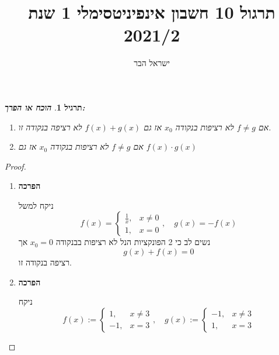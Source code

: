 \documentclass{article}
\begin{document}
\title{תרגול 10 חשבון אינפיניטסימלי 1 שנת 2021/2}
\author{ישראל הבר}
\maketitle

\newtheorem{theorem}{משפט}
\newtheorem{lemma}{למה}
\newtheorem{exercise}{תרגיל}
\newtheorem{homeexercise}{תרגיל לבית}
\newtheorem{example}{דוגמה}
\theoremstyle{definition}
\newtheorem{definition}{הגדרה}
\newtheorem{notation}{סימון}
\newtheorem{claim}{טענה}
\newtheorem{comment}{\emph{הערה}}
\renewcommand\qedsymbol{$\blacksquare$}
\newcommand{\limtoinfty}{\underset{n\rightarrow\infty}{\lim}}
\newcommand{\limtur}{\overset{\infty}{\underset{n=1}{\sum}}}
\newcommand{\limturstart}[1]{\overset{\infty}{\underset{n=#1}{\sum}}}
\newcommand{\limsuptoinfty}{\underset{n\rightarrow\infty}{\limsup}}
\newcommand{\liminftoinfty}{\underset{n\rightarrow\infty}{\liminf}}
\newcommand{\limtoinftym}{\underset{m\rightarrow\infty}{\lim}}
\newcommand{\limtop}{\underset{-}{\lim}}
\newcommand{\limbottom}{\overset{-}{\lim}}
\newcommand{\goesto}{\underset{n\rightarrow\infty}{\longrightarrow}}
\newcommand{\goestom}{\underset{m\rightarrow\infty}{\longrightarrow}}
\newcommand{\goesfrom}{\underset{n\rightarrow\infty}{\longleftarrow}}
\newcommand{\funclim}[2]{\underset{#1\rightarrow#2}{\lim}\,}
\newcommand{\series}[2]{\{#1\}_{#2\in\mathbb{N}}}

\begin{exercise}
\textbf{הוכח או הפרך:}
\begin{enumerate}
\item אם 
$f\neq g$
לא רציפות בנקודה 
$x_0$
אז גם 
$f(x)+g(x)$
לא רציפה בנקודה זו.
\item אם 
$f\neq g$
לא רציפות בנקודה 
$x_0$
אז גם 
$f(x)\cdot g(x)$
\end{enumerate}
\end{exercise}

\begin{proof}
\begin{enumerate}
\item \textbf{הפרכה} \par\noindent
ניקח למשל 
\[f(x)=\begin{cases}\frac{1}{x}, & x\neq 0 \\ 1, & x=0\end{cases},\quad g(x) = -f(x)\]
נשים לב כי 2 הפונקציות הנל לא רציפות בבנקודה 
$x_0=0$
אך 
\[g(x)+f(x) = 0\]
רציפה בנקודה זו.
\item \textbf{הפרכה}\par \noindent
ניקח 
\[f(x):=\begin{cases}1, &x\neq 3\\ -1, &x=3\end{cases},\quad g(x):=\begin{cases}-1, & x\neq 3 \\ 1, & x=3 \end{cases}\]
\end{enumerate}
\end{proof}
\end{document}
